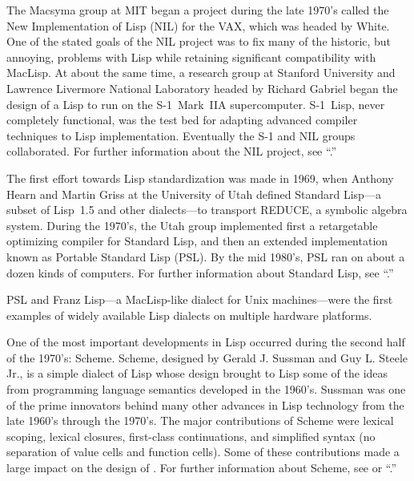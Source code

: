 The Macsyma group at MIT began a project during the late 1970's called
the New Implementation of Lisp (NIL) for the VAX, which was headed by
White.  One of the stated goals of the NIL project was to fix many of
the historic, but annoying, problems with Lisp while retaining significant 
compatibility with MacLisp.  At about the same time, a research group at
Stanford University and Lawrence Livermore National Laboratory headed
by Richard Gabriel began the design of a Lisp to run on the
\hbox{S-1}~Mark~IIA supercomputer.  \hbox{S-1}~Lisp, never completely
functional, was the test bed for adapting advanced compiler techniques
to Lisp implementation.  Eventually the \hbox{S-1} and NIL groups
collaborated.
For further information about the NIL project,
see ``{\NILReport}.''
 
%

The first effort towards Lisp standardization was made in 1969, 
when Anthony Hearn and Martin Griss at the University of Utah 
defined Standard Lisp---a subset of Lisp~1.5 and other dialects---to 
transport REDUCE, a symbolic algebra system.
During the 1970's, the Utah group implemented first a retargetable
optimizing compiler for Standard Lisp,
and then an extended implementation known as Portable Standard Lisp (PSL).
By the mid 1980's, PSL ran on about a dozen kinds of computers.
For further information about Standard Lisp, see ``{\StandardLispReport}.''
 
PSL and Franz Lisp---a MacLisp-like dialect for Unix machines---were 
the first examples of widely available Lisp dialects on multiple 
hardware platforms. 

One of the most important developments in Lisp occurred during the
second half of the 1970's: Scheme. Scheme, designed by Gerald J.
Sussman and Guy L. Steele Jr., is a simple dialect of Lisp whose
design brought to Lisp some of the ideas from programming language
semantics developed in the 1960's.  Sussman was one of the prime
innovators behind many other advances in Lisp technology from the late
1960's through the 1970's.
The major contributions of Scheme were lexical scoping, lexical
closures, first-class continuations, and simplified syntax (no
separation of value cells and function cells). Some of these contributions made
a large impact on the design of \clisp.
For further information about Scheme, see {\IEEEScheme} or ``{\RevisedCubedScheme}.''

